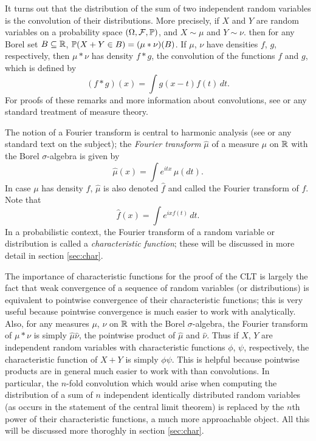 \documentclass{article}
\theoremstyle{definition}
\begin{document}
It turns out that the distribution of the sum of two independent random variables is the convolution of their distributions. More precisely, if $X$ and $Y$ are random variables on a probability space $(\Omega, \mathcal F, \P)$, and $X \sim \mu$ and $Y \sim \nu$. then for any Borel set $B \subseteq \R$,
$\P(X + Y \in B) = (\mu * \nu)(B)$. If $\mu$, $\nu$ have densities $f$, $g$, respectively, then $\mu * \nu$ has density $f * g$, the convolution of the functions $f$ and $g$, which is defined by
\[ (f * g)(x) = \int g(x - t) f(t) \, dt. \]
For proofs of these remarks and more information about convolutions, see \cite{billingsley} or any standard treatment of measure theory.

The notion of a Fourier transform is central to harmonic analysis (see \cite{katznelson} or any standard text on the subject); the {\em Fourier transform} $\hat \mu$ of a measure $\mu$ on $\R$ with the Borel $\sigma$-algebra is given by
\[ \hat \mu (x) = \int e^{itx} \, \mu(dt). \]
In case $\mu$ has density $f$, $\hat \mu$ is also denoted $\hat f$ and called the Fourier transform of $f$. Note that
\[ \hat f(x) = \int e^{ix f(t)} \, dt. \]
In a probabilistic context, the Fourier transform of a random variable or distribution is called a {\em characteristic function}; these will be discussed in more detail in section \ref{sec:char}.

The importance of characteristic functions for the proof of the CLT is largely the fact that weak convergence of a sequence of random variables (or distributions) is equivalent to pointwise convergence of their characteristic functions; this is very useful because pointwise convergence is much easier to work with analytically. Also, for any measures $\mu$, $\nu$ on $\R$ with the Borel $\sigma$-algebra, the Fourier transform of $\mu * \nu$ is simply $\hat \mu \hat \nu$, the pointwise product of $\hat \mu$ and $\hat \nu$. Thus if $X$, $Y$ are independent random variables with characteristic functions $\phi$, $\psi$, respectively, the characteristic function of $X + Y$ is simply $\phi\psi$. This is helpful because pointwise products are in general much easier to work with than convolutions. In particular, the $n$-fold convolution which would arise when computing the distribution of a sum of $n$ independent identically distributed random variables (as occurs in the statement of the central limit theorem) is replaced by the $n$th power of their characteristic functions, a much more approachable object. All this will be discussed more thoroghly in section \ref{sec:char}.
\end{document}
